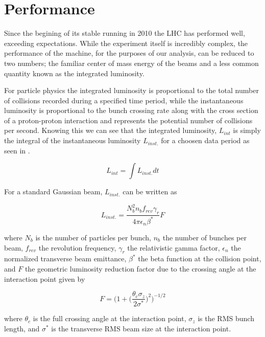 \section{Performance} \label{sec:lhc:performance}

Since the begining of its stable running in 2010 the LHC has performed well,
exceeding expectations.  While the experiment itself is incredibly complex, the
performance of the machine, for the purposes of our analysis, can be reduced to
two numbers; the familiar center of mass energy of the beams and a less common
quantity known as the integrated luminosity.  

For particle physics the integrated luminosity is proportional to the total
number of collisions recorded during a specified time period, while the
instantaneous luminosity is proportional to the bunch crossing rate along with
the cross section of a proton-proton interaction and represents the potential
number of collisions per second.  Knowing this we can see that the integrated
luminosity, $L_{int}$ is simply the integral of the instantaneous luminosity
$L_{inst.}$ for a choosen data period as seen in
.

\begin{equation} \label{eq:integrated_luminosity}
   L_{int} = \int L_{inst.}dt 
\end{equation}

For a standard Gaussian beam, $L_{inst.}$ can be written as

\begin{equation}
  L_{inst.} = \frac{N_{b}^{2}n_{b}f_{rev}\gamma_{r}}{4\pi\epsilon_{n}\beta^{*}}F
\end{equation}

where $N_{b}$ is the number of particles per bunch, $n_{b}$ the number of
bunches per beam, $f_{rev}$ the revolution frequency, $\gamma_{r}$ the
relativistic gamma factor, $\epsilon_{n}$ the normalized transverse beam
emittance, $\beta^{*}$ the beta function at the collision point, and $F$ the
geometric luminosity reduction factor due to the crossing angle at the
interaction point given by

\begin{equation}
  F = \bigg(1 + \Big( \frac{\theta_{c}\sigma_{z}}{2\sigma^{*}} \Big) ^{2}
\bigg)^{-1/2} 
\end{equation}

where $\theta_{c}$ is the full crossing angle at the interaction point,
$\sigma_{z}$ is the RMS bunch length, and $\sigma^{*}$ is the transverse RMS
beam size at the interaction point.

